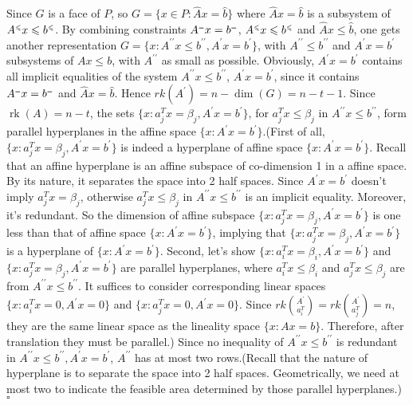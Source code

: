 \documentclass{article}
\DeclareMathOperator{\rk}{rk}
\newcommand{\tleq}{^{\mbox{\tiny $\leqslant$}}}
\newcommand{\teq}{^{\mbox{\tiny $=$}}}
\newenvironment{proof}{{\it Proof.}}{ \hfill $\square$}
\begin{document}
\begin{proof}
Since $G$ is a face of $P$, so $G=\{x\in P: \hat{A}x=\hat{b}\}$ where $\hat{A}x=\hat{b}$ is a subsystem of $A\tleq x\leqslant b\tleq$. By combining constraints $A\teq x=b\teq$, $A\tleq x\leqslant b\tleq$ and $\hat{A}x\leqslant \hat{b}$, one gets another representation $G=\{x:A^{\prime\prime} x\leqslant b^{\prime\prime}, A^\prime x=b^\prime\}$, with $A^{\prime\prime} \leqslant b^{\prime\prime}$ and $A^\prime x=b^\prime$ subsystems of $Ax\leqslant b$, with $A^{\prime\prime}$ as small as possible. Obviously, $A^\prime x=b^\prime$ contains all implicit equalities of the system $A^{\prime\prime} x\leqslant b^{\prime\prime}$, $A^\prime x=b^\prime$, since it contains $A\teq x=b\teq$ and $\hat{A}x=\hat{b}$. Hence $rk(A^\prime)=n-\dim(G)=n-t-1$. Since $\rk(A)=n-t$, the sets $\{x: a_j^T x=\beta_j , A^\prime x=b^\prime\}$, for $a_j^T x\leqslant \beta_j$ in $A^{\prime\prime}x\leqslant b^{\prime\prime}$, form parallel hyperplanes in the affine space $\{x:A^\prime x=b^\prime\}$.(First of all, $\{x: a_j^T x=\beta_j , A^\prime x=b^\prime\}$ is indeed a hyperplane of affine space $\{x:A^\prime x=b^\prime\}$. Recall that an affine hyperplane is an affine subspace of co-dimension 1 in a affine space. By its nature, it separates the space into 2 half spaces. Since $A^\prime x=b^\prime$ doesn't imply $a_j^T x=\beta_j$, otherwise $a_j^T x\leqslant \beta_j$ in $A^{\prime\prime}x\leqslant b^{\prime\prime}$ is an implicit equality. Moreover, it's redundant. So the dimension of affine subspace $\{x: a_j^T x=\beta_j , A^\prime x=b^\prime\}$ is one less than that of affine space $\{x:A^\prime x=b^\prime\}$, implying that $\{x: a_j^T x=\beta_j , A^\prime x=b^\prime\}$ is a hyperplane of $\{x:A^\prime x=b^\prime\}$. Second, let's show $\{x: a_i^T x=\beta_i , A^\prime x=b^\prime\}$ and $\{x: a_j^T x=\beta_j , A^\prime x=b^\prime\}$ are parallel hyperplanes, where $a_i^T x\leqslant\beta_i$ and $a_j^T x\leqslant \beta_j$ are from $A^{\prime\prime}x\leqslant b^{\prime\prime}$. It suffices to consider corresponding linear spaces $\{x: a_i^T x=0 , A^\prime x=0\}$ and $\{x: a_j^T x=0 , A^\prime x=0\}$. Since $rk{\binom{A^\prime}{a_i^T}}=rk{\binom{A^\prime}{a_j^T}}=n$, they are the same linear space as the lineality space $\{x:Ax=b\}$. Therefore, after translation they must be parallel.) Since no inequality of $A^{\prime\prime}x\leqslant b^{\prime\prime}$ is redundant in $A^{\prime\prime}x\leqslant b^{\prime\prime}, A^\prime x=b^\prime$, $A^{\prime\prime}$ has at most two rows.(Recall that the nature of hyperplane is to separate the space into 2 half spaces. Geometrically, we need at most two to indicate the feasible area determined by those parallel hyperplanes.)
\end{proof}
\end{document}
